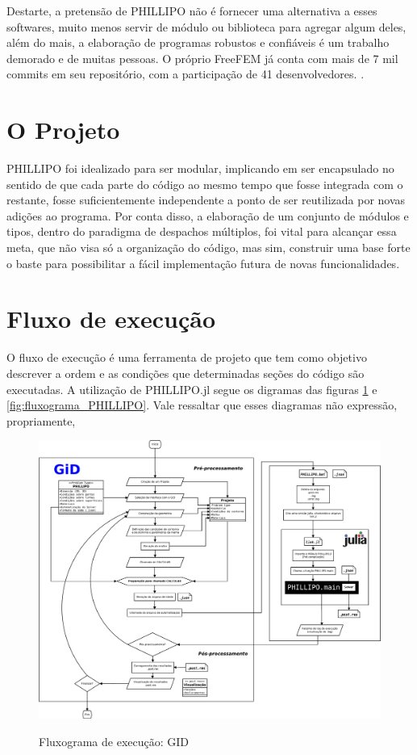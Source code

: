 Destarte, a pretensão de PHILLIPO não é fornecer uma alternativa a esses softwares, muito menos servir de módulo ou biblioteca para agregar algum deles, além do mais, a elaboração de programas robustos e confiáveis é um trabalho demorado e de muitas pessoas. O próprio FreeFEM já conta com mais de 7 mil commits em seu repositório, com a participação de 41 desenvolvedores. \cite{Hecht}. 

\section{O Projeto}

PHILLIPO foi idealizado para ser modular, implicando em ser encapsulado no sentido de que cada parte do código ao mesmo tempo que fosse integrada com o restante, fosse suficientemente independente a ponto de ser reutilizada por novas adições ao programa. Por conta disso, a elaboração de um conjunto de módulos e tipos, dentro do paradigma de despachos múltiplos, foi vital para alcançar essa meta, que não visa só a organização do código, mas sim, construir uma base forte o baste para possibilitar a fácil implementação futura de novas funcionalidades.

\section{Fluxo de execução}

O fluxo de execução é uma ferramenta de projeto que tem como objetivo descrever a ordem e as condições que determinadas seções do código são executadas. A utilização de PHILLIPO.jl segue os digramas das figuras \ref{fig:fluxograma_GID} e \ref{fig:fluxograma_PHILLIPO}. Vale ressaltar que esses diagramas não expressão, propriamente, 

\begin{figure}
    \centering
    \caption{Fluxograma de execução: GID}
    \includegraphics[width = \textwidth]{Figuras/fluxograma_GID.pdf}
    \label{fig:fluxograma_GID}
\end{figure}

